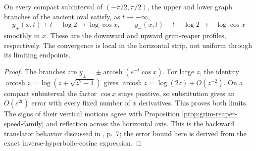 \begin{proposition}\label{prop:ancient-oval-translator-limits}
On every compact subinterval of $(-\pi/2,\pi/2)$, the upper and lower graph branches of the ancient oval satisfy, as $t\to-\infty$,
\[
 y_+(x,t)+t-\log2\longrightarrow\log\cos x,
 \qquad y_-(x,t)-t+\log2\longrightarrow-\log\cos x
\]
smoothly in $x$. These are the downward and upward grim-reaper profiles, respectively. The convergence is local in the horizontal strip, not uniform through its limiting endpoints.
\end{proposition}
\begin{proof}
The branches are $y_\pm=\pm\operatorname{arcosh}(e^{-t}\cos x)$. For large $z$, the identity $\operatorname{arcosh}z=\log(z+\sqrt{z^2-1})$ gives $\operatorname{arcosh}z=\log(2z)+O(z^{-2})$. On a compact subinterval the factor $\cos x$ stays positive, so substitution gives an $O(e^{2t})$ error with every fixed number of $x$ derivatives. This proves both limits. The signs of their vertical motions agree with Proposition \ref{prop:grim-reaper-speed-family} and reflection across the horizontal axis. This is the backward translator behavior discussed in \cite{BV11}, p.~7; the error bound here is derived from the exact inverse-hyperbolic-cosine expression.
\end{proof}
